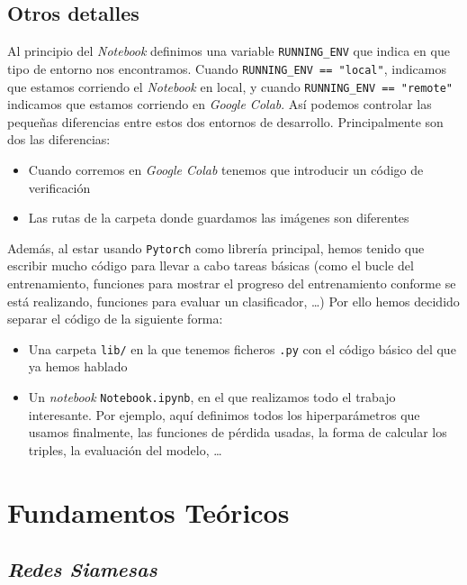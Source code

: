 \documentclass[11pt]{article}
\begin{document}
\subsection{Otros detalles}

Al principio del \emph{Notebook} definimos una variable \lstinline{RUNNING_ENV} que indica en que tipo de entorno nos encontramos. Cuando \lstinline{RUNNING_ENV == "local"}, indicamos que estamos corriendo el \emph{Notebook} en local, y cuando \lstinline{RUNNING_ENV == "remote"} indicamos que estamos corriendo en \emph{Google Colab}. Así podemos controlar las pequeñas diferencias entre estos dos entornos de desarrollo. Principalmente son dos las diferencias:

\begin{itemize}
    \item Cuando corremos en \emph{Google Colab} tenemos que introducir un código de verificación
    \item Las rutas de la carpeta donde guardamos las imágenes son diferentes
\end{itemize}

Además, al estar usando \lstinline{Pytorch} como librería principal, hemos tenido que escribir mucho código para llevar a cabo tareas básicas (como el bucle del entrenamiento, funciones para mostrar el progreso del entrenamiento conforme se está realizando, funciones para evaluar un clasificador, \ldots) Por ello hemos decidido separar el código de la siguiente forma:

\begin{itemize}
  \item Una carpeta \lstinline{lib/} en la que tenemos ficheros \lstinline{.py} con el código básico del que ya hemos hablado
  \item Un \emph{notebook} \lstinline{Notebook.ipynb}, en el que realizamos todo el trabajo interesante. Por ejemplo, aquí definimos todos los hiperparámetros que usamos finalmente, las funciones de pérdida usadas, la forma de calcular los triples, la evaluación del modelo, \ldots
\end{itemize}


\pagebreak

\section{Fundamentos Teóricos} 

\subsection {\emph{Redes Siamesas}}
\end{document}
